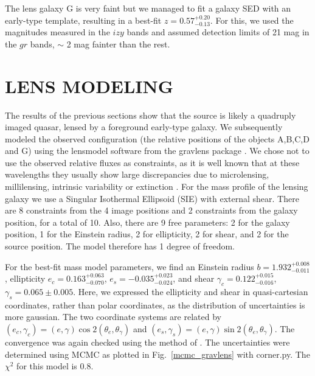\documentclass[manuscript]{aastex}
\begin{document}
The lens galaxy G is very faint but we managed to fit a galaxy SED with an early-type template, resulting in a best-fit $z = 0.57^{+0.20}_{-0.13}$. For this, we used the magnitudes measured in the $izy$ bands and assumed detection limits of 21 mag in the $gr$ bands, $\sim$ 2 mag fainter than the rest. 

\section{LENS MODELING}

The results of the previous sections show that the source is likely a quadruply imaged quasar, lensed by a foreground early-type galaxy. We subsequently modeled the observed configuration (the relative positions of the objects A,B,C,D and G) using the lensmodel software from the gravlens package \citep{kee01}. We chose not to use the observed relative fluxes as constraints, as it is well known that at these wavelengths they usually show large discrepancies due to microlensing, millilensing, intrinsic variability or extinction \citep[e.g.,][]{slu08}. For the mass profile of the lensing galaxy we use a Singular Isothermal Ellipsoid (SIE) with external shear. There are 8 constraints from the 4 image positions and 2 constraints from the galaxy position, for a total of 10. Also, there are 9 free parameters: 2 for the galaxy position, 1 for the Einstein radius, 2 for ellipticity, 2 for shear, and 2 for the source position. The model therefore has 1 degree of freedom.

For the best-fit mass model parameters, we find an Einstein radius $b = 1.932_{-0.011}^{+0.008}$, ellipticity $e_c = 0.163_{-0.070}^{+0.063}$, $e_s = -0.035_{-0.024}^{+0.023}$, and shear $\gamma_c = 0.122_{-0.016}^{+0.015}$, $\gamma_s = 0.065\pm0.005$. Here, we expressed the ellipticity and shear in quasi-cartesian coordinates, rather than polar coordinates, as the distribution of uncertainties is more gaussian. The two coordinate systems are related by $(e_c,\gamma_c) = (e,\gamma)\cos2(\theta_e,\theta_\gamma)$ and $(e_s,\gamma_s) = (e,\gamma)\sin2(\theta_e,\theta_\gamma)$. The convergence was again checked using the method of \citet{gel95}. The uncertainties were determined using MCMC as plotted in Fig.~\ref{mcmc_gravlens} with corner.py. The $\chi^2$ for this model is 0.8. 
\end{document}
